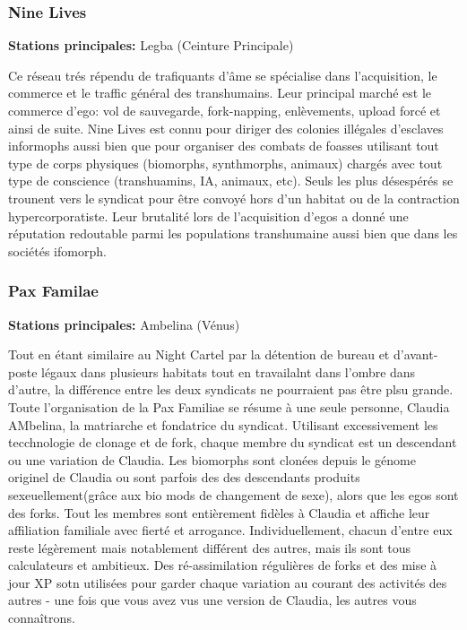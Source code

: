 \subsubsection{Nine Lives} \label{sec:nine-lives} 

\textbf{Stations principales:} Legba (Ceinture Principale) 

Ce réseau trés répendu de trafiquants d'âme se spécialise dans l'acquisition, le commerce et le traffic général des transhumains. Leur principal marché est le commerce d'ego: vol de sauvegarde, fork-napping, enlèvements, upload forcé et ainsi de suite. Nine Lives est connu pour diriger des colonies illégales d'esclaves informophs aussi bien que pour organiser des combats de foasses utilisant tout type de corps physiques (biomorphs, synthmorphs, animaux) chargés avec tout type de conscience (transhuamins, IA, animaux, etc). Seuls les plus désespérés se trounent vers le syndicat pour être convoyé hors d'un habitat ou de la contraction hypercorporatiste. Leur brutalité lors de l'acquisition d'egos a donné une réputation redoutable parmi les populations transhumaine aussi bien que dans les sociétés ifomorph. 

\subsubsection{Pax Familae} \label{sec:pax-familae} 

\textbf{Stations principales:} Ambelina (Vénus) 

Tout en étant similaire au Night Cartel par la détention de bureau et d'avant-poste légaux dans plusieurs habitats tout en travailalnt dans l'ombre dans d'autre, la différence entre les deux syndicats ne pourraient pas être plsu grande. Toute l'organisation de la Pax Familiae se résume à une seule personne, Claudia AMbelina, la matriarche et fondatrice du syndicat. Utilisant excessivement les tecchnologie de  clonage et de fork, chaque membre du syndicat est un descendant ou une variation de Claudia. Les biomorphs sont clonées depuis le génome originel de Claudia ou sont parfois des des descendants produits sexeuellement(grâce aux bio mods de changement de sexe), alors que les egos sont des forks. Tout les membres sont entièrement fidèles à Claudia et affiche leur affiliation familiale avec fierté et arrogance. Individuellement, chacun d'entre eux reste légèrement mais notablement différent des autres, mais ils sont tous calculateurs et ambitieux. Des ré-assimilation régulières de forks et des mise à jour XP sotn utilisées pour garder chaque variation au courant des activités des autres - une fois que vous avez vus une version de Claudia, les autres vous connaîtrons. 

